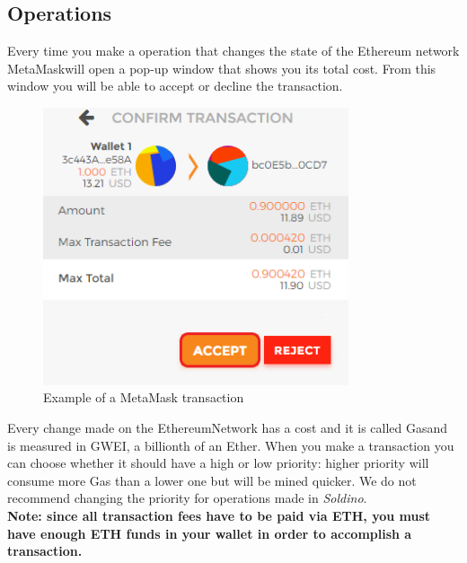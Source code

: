 	\subsection{Operations}
	Every time you make a operation that changes the state of the Ethereum\glosp 
	network MetaMask\glosp will open a pop-up window that shows you its total cost.
	From this window you will be able to accept or decline the transaction.\\
	\begin{figure}[H]
		\includegraphics[width=9cm]{res/images/metamask_transaction.png}
		\centering
		\caption{Example of a MetaMask transaction}
	\end{figure}
	\noindent 
	Every change made on the Ethereum\glosp Network has a cost and it is called 
	Gas\glosp and is measured in GWEI, a billionth of an Ether\glo. When you 
	make a transaction you can choose whether it should have a high or low 
	priority: higher priority will consume more Gas than a lower one but will 
	be mined quicker. We do not recommend changing the priority for 
	operations made in \textit{Soldino}.\\
	\textbf{Note: since all transaction fees have to be paid via ETH, you must have enough ETH funds in your wallet in order to accomplish a transaction.}
